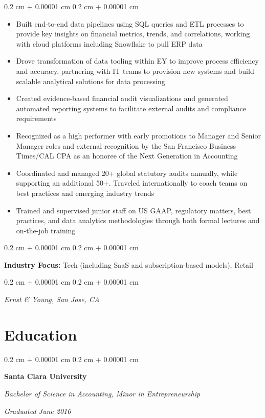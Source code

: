 \documentclass[10pt, letterpaper]{article}
\newenvironment{highlights}{
    \begin{itemize}[
        topsep=0.10 cm,
        parsep=0.10 cm,
        partopsep=0pt,
        itemsep=0pt,
        leftmargin=0.4 cm + 10pt
    ]
}{
    \end{itemize}
} %
\newenvironment{onecolentry}{
    \begin{adjustwidth}{
        0.2 cm + 0.00001 cm
    }{
        0.2 cm + 0.00001 cm
    }
}{
    \end{adjustwidth}
} %
\newenvironment{twocolentry}[2][]{
    \onecolentry
    \def\secondColumn{#2}
    \setcolumnwidth{\fill, 4.5 cm}
    \begin{paracol}{2}
}{
    \switchcolumn \raggedleft \secondColumn
    \end{paracol}
    \endonecolentry
} %
\begin{document}
\begin{onecolentry}
\begin{highlights}
                \item Built end-to-end data pipelines using SQL queries and ETL processes to provide key insights on financial metrics, trends, and correlations, working with cloud platforms including Snowflake to pull ERP data
                \item Drove transformation of data tooling within EY to improve process efficiency and accuracy, partnering with IT teams to provision new systems and build scalable analytical solutions for data processing
                \item Created evidence-based financial audit visualizations and generated automated reporting systems to facilitate external audits and compliance requirements
                \item Recognized as a high performer with early promotions to Manager and Senior Manager roles and external recognition by the San Francisco Business Times/CAL CPA as an honoree of the Next Generation in Accounting
                \item Coordinated and managed 20+ global statutory audits annually, while supporting an additional 50+. Traveled internationally to coach teams on best practices and emerging industry trends
                \item Trained and supervised junior staff on US GAAP, regulatory matters, best practices, and data analytics methodologies through both formal lectures and on-the-job training
            \end{highlights}
        \end{onecolentry}

        \vspace{0.10 cm}
        \begin{onecolentry}
            \textbf{Industry Focus:} Tech (including SaaS and subscription-based models), Retail
        \end{onecolentry}

        \vspace{0.10 cm}
        \begin{onecolentry}
            \textit{Ernst \& Young, San Jose, CA}
        \end{onecolentry}

    
    \section{Education}

        \begin{twocolentry}{
            \textit{Graduated June 2016}}
            \textbf{Santa Clara University}

            \textit{Bachelor of Science in Accounting, Minor in Entrepreneurship}
        \end{twocolentry}
\end{document}
